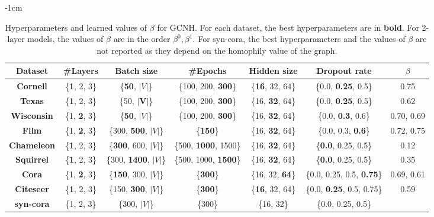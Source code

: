 \documentclass[conference]{IEEEtran}
\begin{document}
\begin{table*}[t]
    \centering
    \footnotesize
    \addtolength{\leftskip} {-1cm}
    \addtolength{\rightskip}{-1cm}
    \begin{tabular}{ c c c c c c c }
    \toprule
    \textbf{Dataset} & \textbf{\#Layers} & \textbf{Batch size} & \textbf{\#Epochs} & \textbf{Hidden size} & \textbf{Dropout rate} & $\beta$ \\
    \midrule
    \textbf{Cornell} & \{\textbf{1}, 2, 3\} & \{\textbf{50}, $|V|$\} & \{100, 200, \textbf{300}\} & \{\textbf{16}, 32, 64\} & \{0.0, \textbf{0.25}, 0.5\} & 0.75 \\
    \textbf{Texas} & \{\textbf{1}, 2, 3\} & \{50, $\boldsymbol{|V|}$\} & \{100, 200, \textbf{300}\} & \{16, \textbf{32}, 64\} & \{0.0, \textbf{0.25}, 0.5\} & 0.62 \\
    \textbf{Wisconsin} & \{1, \textbf{2}, 3\} & \{\textbf{50}, $|V|$\} & \{100, 200, \textbf{300}\} & \{16, \textbf{32}, 64\} & \{0.0, \textbf{0.3}, 0.6\} & 0.70, 0.69\\
    \textbf{Film} & \{1, \textbf{2}, 3\} & \{300, \textbf{500}, $|V|$\} & \{\textbf{150}\} & \{16, \textbf{32}, 64\} & \{0.0, 0.3, \textbf{0.6}\} & 0.72, 0.75 \\
    \textbf{Chameleon} & \{\textbf{1}, 2, 3\} & \{\textbf{300}, 600, $|V|$\} & \{500, \textbf{1000}, 1500\} & \{16, \textbf{32}, 64\} & \{\textbf{0.0}, 0.25, 0.5\} & 0.12 \\
    \textbf{Squirrel} & \{\textbf{1}, 2, 3\} & \{300, \textbf{1400}, $|V|$\} & \{500, 1000, \textbf{1500}\} & \{16, \textbf{32}, 64\} & \{\textbf{0.0}, 0.25, 0.5\} & 0.35 \\
    \textbf{Cora} & \{1, \textbf{2}, 3\} & \{\textbf{150}, 300, $|V|$\} & \{\textbf{300}\} & \{16, 32, \textbf{64}\} & \{0.0, 0.25, 0.5, \textbf{0.75}\} & 0.69, 0.61 \\
    \textbf{Citeseer} & \{\textbf{1}, 2, 3\} & \{150, \textbf{300}, $|V|$\} & \{\textbf{300}\} & \{\textbf{16}, 32, 64\} & \{0.0, \textbf{0.25}, 0.5, 0.75\} & 0.59 \\
    \textbf{syn-cora} & \{1, 2, 3\} & \{300, $|V|$\} & \{300\} & \{16, 32\} & \{0.0, 0.25, 0.5\} \\
    \bottomrule
    
    \end{tabular}
    \caption{Hyperparameters and learned values of $\beta$ for GCNH. For each dataset, the best hyperparameters are in \textbf{bold}. For 2-layer models, the values of $\beta$ are in the order $\beta^0, \beta^1$. For syn-cora, the best hyperparameters and the values of $\beta$ are not reported as they depend on the homophily value of the graph.} 
    \label{tab:gcnh_hyp}
\end{table*}
\end{document}
